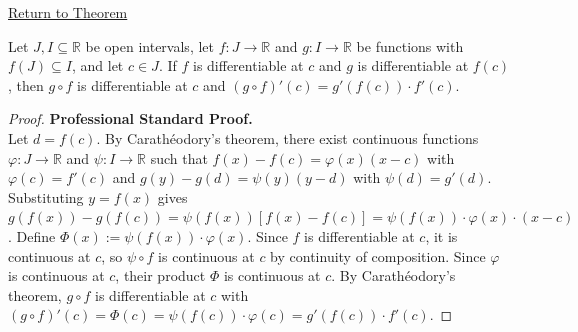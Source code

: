 \newpage
{}
\label{prf:chain-rule}

\begin{remark*}[Return]
\hyperref[thm:chain-rule]{Return to Theorem}
\end{remark*}

\begin{theorem*}
Let $J, I \subseteq \mathbb{R}$ be open intervals, let $f : J \to \mathbb{R}$ and $g : I \to \mathbb{R}$ be functions with $f(J) \subseteq I$, and let $c \in J$. If $f$ is differentiable at $c$ and $g$ is differentiable at $f(c)$, then $g \circ f$ is differentiable at $c$ and $(g \circ f)'(c) = g'(f(c)) \cdot f'(c)$.
\end{theorem*}

\begin{proof}
\textbf{Professional Standard Proof.}~\\
Let $d = f(c)$. By Carathéodory's theorem, there exist continuous functions $\varphi : J \to \mathbb{R}$ and $\psi : I \to \mathbb{R}$ such that $f(x) - f(c) = \varphi(x)(x - c)$ with $\varphi(c) = f'(c)$ and $g(y) - g(d) = \psi(y)(y - d)$ with $\psi(d) = g'(d)$. Substituting $y = f(x)$ gives $g(f(x)) - g(f(c)) = \psi(f(x))[f(x) - f(c)] = \psi(f(x)) \cdot \varphi(x) \cdot (x - c)$. Define $\Phi(x) := \psi(f(x)) \cdot \varphi(x)$. Since $f$ is differentiable at $c$, it is continuous at $c$, so $\psi \circ f$ is continuous at $c$ by continuity of composition. Since $\varphi$ is continuous at $c$, their product $\Phi$ is continuous at $c$. By Carathéodory's theorem, $g \circ f$ is differentiable at $c$ with $(g \circ f)'(c) = \Phi(c) = \psi(f(c)) \cdot \varphi(c) = g'(f(c)) \cdot f'(c)$.
\end{proof}

